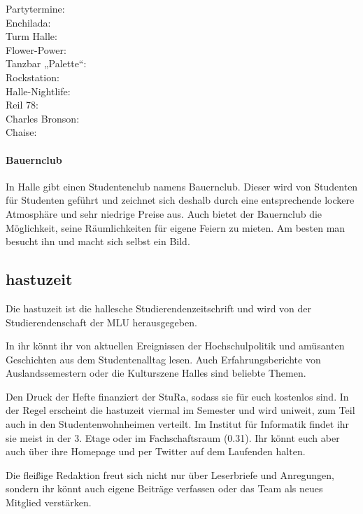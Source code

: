 Partytermine:  \\
Enchilada:  \\
Turm Halle:  \\
Flower-Power:  \\
Tanzbar „Palette“:  \\
Rockstation:  \\
Halle-Nightlife: \\
Reil 78:  \\
Charles Bronson: \\
Chaise: 

\paragraph{Bauernclub}
In Halle gibt einen Studentenclub namens Bauernclub.
Dieser wird von Studenten für Studenten geführt und zeichnet sich deshalb durch eine entsprechende lockere Atmosphäre und sehr niedrige Preise aus.
Auch bietet der Bauernclub die Möglichkeit, seine Räumlichkeiten für eigene Feiern zu mieten.
Am besten man besucht ihn und macht sich selbst ein Bild.

        
\subsection{hastuzeit}
Die hastuzeit ist die hallesche Studierendenzeitschrift und wird von der Studierendenschaft der MLU herausgegeben.

In ihr könnt ihr von aktuellen Ereignissen der Hochschulpolitik und amüsanten Geschichten aus dem Studentenalltag lesen.
Auch Erfahrungsberichte von Auslandssemestern oder die Kulturszene Halles sind beliebte Themen.

Den Druck der Hefte finanziert der StuRa, sodass sie für euch kostenlos sind.
In der Regel erscheint die hastuzeit viermal im Semester und wird uniweit, zum Teil auch in den Studentenwohnheimen verteilt.
Im Institut für Informatik findet ihr sie meist in der 3. Etage oder im Fachschaftsraum (0.31).
Ihr könnt euch aber auch über ihre Homepage und per Twitter auf dem Laufenden halten.

Die fleißige Redaktion freut sich nicht nur über Leserbriefe und Anregungen, sondern ihr könnt auch eigene Beiträge verfassen oder das Team als neues Mitglied verstärken.

\\
\\



